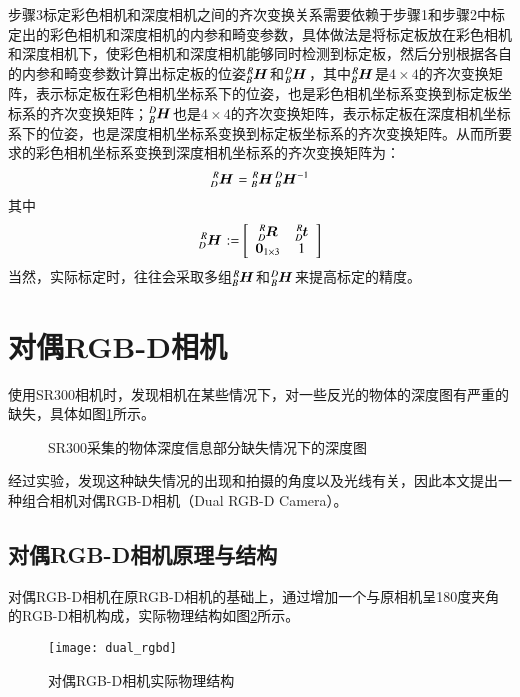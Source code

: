 步骤3标定彩色相机和深度相机之间的齐次变换关系需要依赖于步骤1和步骤2中标定出的彩色相机和深度相机的内参和畸变参数，具体做法是将标定板放在彩色相机和深度相机下，使彩色相机和深度相机能够同时检测到标定板，然后分别根据各自的内参和畸变参数计算出标定板的位姿$\tensor*[^R_B]{\bm{H}}{}$和$\tensor*[^D_B]{\bm{H}}{}$，其中$\tensor*[^R_B]{\bm{H}}{}$是$4\times 4$的齐次变换矩阵，表示标定板在彩色相机坐标系下的位姿，也是彩色相机坐标系变换到标定板坐标系的齐次变换矩阵；$\tensor*[^D_B]{\bm{H}}{}$也是$4\times 4$的齐次变换矩阵，表示标定板在深度相机坐标系下的位姿，也是深度相机坐标系变换到标定板坐标系的齐次变换矩阵。从而所要求的彩色相机坐标系变换到深度相机坐标系的齐次变换矩阵为：
\begin{equation}
  \tensor*[^R_D]{\bm{H}}{} = \tensor*[^R_B]{\bm{H}}{}\tensor*[^D_B]{\bm{H}}{^{-1}}
\end{equation}
其中
\begin{equation}
  \tensor*[^R_D]{\bm{H}}{} := \left[
    \begin{array}{cc}
      \tensor*[^R_D]{\bm{R}}{}& \tensor*[^R_D]{\bm{t}}{}\\
      \bm{0}_{1\times 3}&1
    \end{array}
\right]
\end{equation}
当然，实际标定时，往往会采取多组$\tensor*[^R_B]{\bm{H}}{}$和$\tensor*[^D_B]{\bm{H}}{}$来提高标定的精度。

\section{对偶RGB-D相机}
使用SR300相机时，发现相机在某些情况下，对一些反光的物体的深度图有严重的缺失，具体如图\ref{fig:depth_missing}所示。
\begin{figure}[!ht]
  \centering
  \hfill
  \caption{SR300采集的物体深度信息部分缺失情况下的深度图}
  \label{fig:depth_missing}
\end{figure}
经过实验，发现这种缺失情况的出现和拍摄的角度以及光线有关，因此本文提出一种组合相机对偶RGB-D相机（Dual RGB-D Camera）。

\subsection{对偶RGB-D相机原理与结构}
对偶RGB-D相机在原RGB-D相机的基础上，通过增加一个与原相机呈180度夹角的RGB-D相机构成，实际物理结构如图\ref{fig:dual_rgbd}所示。
\begin{figure}[!ht]
  \centering
  \texttt{[image: dual\_rgbd]}
  \caption{对偶RGB-D相机实际物理结构}
  \label{fig:dual_rgbd}
\end{figure}

